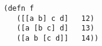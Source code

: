 \begin{lstlisting}[style=reclojureClojure,frame=single]
(defn f
   ([[a b] c d]   12)
   ([a [b c] d]   13)
   ([a b [c d]]   14))
\end{lstlisting}
